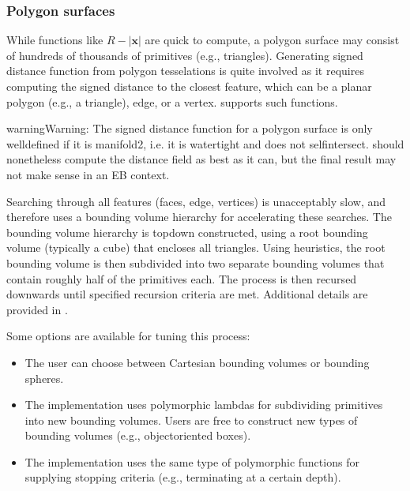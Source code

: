 \documentclass[letterpaper,10pt,english]{sphinxmanual}
\begin{document}
\subsubsection{Polygon surfaces}
\label{\detokenize{Source/SpatialDiscretization:polygon-surfaces}}
While functions like \(R - \left|\mathbf{x}\right|\) are quick to compute, a polygon surface may consist of hundreds of thousands of primitives (e.g., triangles).
Generating signed distance function from polygon tesselations is quite involved as it requires computing the signed distance to the closest feature, which can be a planar polygon (e.g., a triangle), edge, or a vertex.
 supports such functions.

\begin{sphinxadmonition}{warning}{Warning:}
The signed distance function for a polygon surface is only well\sphinxhyphen{}defined if it is manifold\sphinxhyphen{}2, i.e. it is watertight and does not self\sphinxhyphen{}intersect.
 should nonetheless compute the distance field as best as it can, but the final result may not make sense in an EB context.
\end{sphinxadmonition}

Searching through all features (faces, edge, vertices) is unacceptably slow, and  therefore uses a bounding volume hierarchy for accelerating these searches.
The bounding volume hierarchy is top\sphinxhyphen{}down constructed, using a root bounding volume (typically a cube) that encloses all triangles.
Using heuristics, the root bounding volume is then subdivided into two separate bounding volumes that contain roughly half of the primitives each.
The process is then recursed downwards until specified recursion criteria are met.
Additional details are provided in {\hyperref[\detokenize{Utilities/ComplexGeometries:chap-complexgeometries}]{}}.

Some options are available for tuning this process:
\begin{itemize}
\item {} 
The user can choose between Cartesian bounding volumes or bounding spheres.

\item {} 
The implementation uses polymorphic lambdas for subdividing primitives into new bounding volumes.
Users are free to construct new types of bounding volumes (e.g., object\sphinxhyphen{}oriented boxes).

\item {} 
The implementation uses the same type of polymorphic functions for supplying stopping criteria (e.g., terminating at a certain depth).

\end{itemize}
\end{document}
